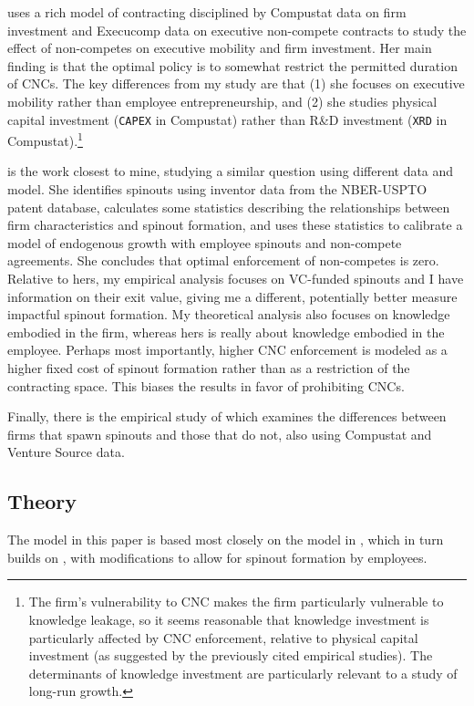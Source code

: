 \documentclass[11pt,english]{article}
\theoremstyle{remark}
\begin{document}
\cite{shi_restrictions_2018} uses a rich model of contracting disciplined by Compustat data on firm investment and Execucomp data on executive non-compete contracts to study the effect of non-competes on executive mobility and firm investment. Her main finding is that the optimal policy is to somewhat restrict the permitted duration of CNCs. The key differences from my study are that (1) she focuses on executive mobility rather than employee entrepreneurship, and (2) she studies physical capital investment (\texttt{CAPEX} in Compustat) rather than R\&D investment (\texttt{XRD} in Compustat).\footnote{The firm's vulnerability to CNC makes the firm particularly vulnerable to knowledge leakage, so it seems reasonable that knowledge investment is particularly affected by CNC enforcement, relative to physical capital investment (as suggested by the previously cited empirical studies). The determinants of knowledge investment are particularly relevant to a study of long-run growth.} 

\cite{baslandze_spinout_2019} is the work closest to mine, studying a similar question using different data and model. She identifies spinouts using inventor data from the NBER-USPTO patent database, calculates some statistics describing the relationships between firm characteristics and spinout formation, and uses these statistics to calibrate a model of endogenous growth with employee spinouts and non-compete agreements. She concludes that optimal enforcement of non-competes is zero. Relative to hers, my empirical analysis focuses on VC-funded spinouts and I have information on their exit value, giving me a different, potentially better measure impactful spinout formation. My theoretical analysis also focuses on knowledge embodied in the firm, whereas hers is really about knowledge embodied in the employee. Perhaps most importantly, higher CNC enforcement is modeled as a higher fixed cost of spinout formation rather than as a restriction of the contracting space. This biases the results in favor of prohibiting CNCs. 

Finally, there is the empirical study of \cite{gompers_entrepreneurial_2005} which examines the differences between firms that spawn spinouts and those that do not, also using Compustat and Venture Source data. 

\subsection*{Theory}

The model in this paper is based most closely on the model in \cite{akcigit_growth_2018}, which in turn builds on \cite{grossman_quality_1991}, with modifications to allow for spinout formation by employees. 
\end{document}

